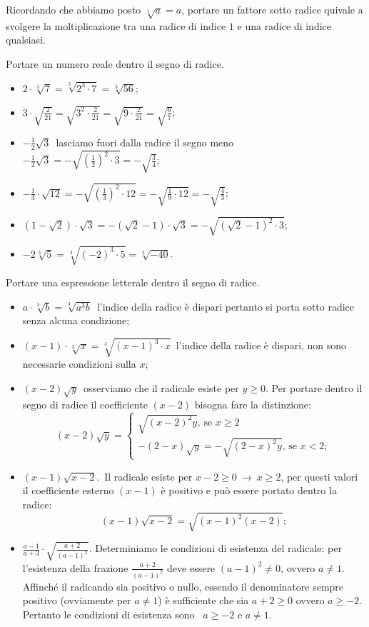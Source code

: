 Ricordando che abbiamo posto $\sqrt[1]a=a$, portare un fattore sotto radice quivale a svolgere la moltiplicazione tra una radice di indice $1$ e una radice di indice qualsiasi.
\begin{exrig}
 \begin{esempio}
 Portare un numero reale dentro il segno di radice.
 \begin{itemize}
 \item $2\cdot \sqrt[3]7=\sqrt[3]{2^3\cdot 7}=\sqrt[3]{56}$;
 \item $3\cdot \sqrt{\frac 2{21}}=\sqrt{3^2\cdot \frac 2{21}}=\sqrt{9\cdot \frac 2{21}}=\sqrt{\frac 6 7}$;
 \item $-\frac 1 2\sqrt 3$\, lasciamo fuori dalla radice il segno meno $-\frac 1 2\sqrt 3=-\sqrt{\left(\frac 1 2\right)^2\cdot 3}=-\sqrt{\frac 3 4}$;
 \item $-\frac 1 3\cdot \sqrt{12}=-\sqrt{\left(\frac 1 3\right)^2\cdot 12}=-\sqrt{\frac 1 9\cdot 12}=-\sqrt{\frac 4 3}$;
 \item $(1-\sqrt 2)\cdot \sqrt 3=-(\sqrt 2-1)\cdot \sqrt 3=-\sqrt{(\sqrt 2-1)^2\cdot 3}$;
 \item $-2\sqrt[3]5=\sqrt[3]{(-2)^3\cdot 5}=\sqrt[3]{-40}$.
 \end{itemize}
 \end{esempio}

 \begin{esempio}
 Portare una espressione letterale dentro il segno di radice.
 \begin{itemize}
 \item $a\cdot \sqrt[3]b=\sqrt[3]{a^3b}$\, l'indice della radice è dispari pertanto si porta sotto radice senza alcuna condizione;
 \item $(x-1)\cdot \sqrt[3]x=\sqrt[3]{(x-1)^3\cdot x}$\, l'indice della radice è dispari, non sono necessarie condizioni sulla $x$;
 \item $(x-2)\sqrt y$\, osserviamo che il radicale esiste per $y\ge 0$.
 Per portare dentro il segno di radice il coefficiente $(x-2)$ bisogna fare la distinzione:
 \[
 (x-2)\sqrt y=\left\{\begin{array}{l}\sqrt{(x-2)^2y}\text{, se }x\ge 2\\-(2-x)\sqrt y=-\sqrt{(2-x)^2y}\text{, se }x<2;\end{array}\right.
 \]
 \item $(x-1)\sqrt{x-2}$.\, Il radicale esiste per $x-2\ge 0\ \to \ x\ge 2$, per questi valori il coefficiente esterno $(x-1)$ è positivo e può essere portato dentro la radice: \[(x-1)\sqrt{x-2}=\sqrt{(x-1)^2(x-2)};\]
 \item $\frac{a-1}{a+3}\cdot \sqrt{\frac{a+2}{(a-1)^2}}$. Determiniamo le condizioni di esistenza del radicale: per l'esistenza della frazione $\frac{a+2}{(a-1)^2}$ deve essere $(a-1)^2\neq 0$, ovvero $a\neq 1$. Affinché il radicando sia positivo o nullo, essendo il denominatore sempre positivo (ovviamente per $a\neq 1$) è sufficiente che sia $a+2\geqslant 0$ ovvero $a\geqslant -2$. Pertanto le condizioni di esistenza sono~ $a\geqslant -2$ e $a\neq 1$.


\end{itemize}
\end{esempio}
\end{exrig}
